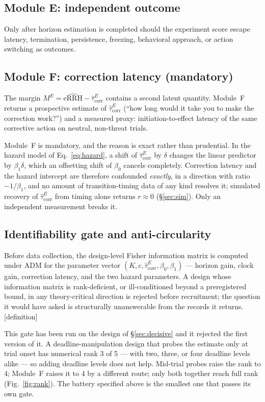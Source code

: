 \documentclass[9pt,twocolumn]{article}
\newcommand{\eRRHhat}{\widehat{\mathrm{eRRH}}}
\newcommand{\tcorr}{\widehat{\tau}^{E}_{\mathrm{corr}}}
\newcommand{\tier}[1]{{\sffamily\scriptsize\color{RRHMSlate}[#1]}}
\begin{document}
\subsection{Module E: independent outcome}
Only after horizon estimation is completed should the experiment score escape latency, termination, persistence, freezing, behavioral approach, or action switching as outcomes.

\subsection{Module F: correction latency (mandatory)}
The margin $M^E=\eRRHhat-\tcorr$ contains a second latent quantity. Module~F returns a prospective estimate of $\tcorr$ (``how long would it take you to make the correction work?'') and a measured proxy: initiation-to-effect latency of the same corrective action on neutral, non-threat trials.

Module~F is mandatory, and the reason is exact rather than prudential. In the hazard model of Eq.~\ref{eq:hazard}, a shift of $\tcorr$ by $\delta$ changes the linear predictor by $\beta_1\delta$, which an offsetting shift of $\beta_{0}$ cancels completely. Correction latency and the hazard intercept are therefore confounded \emph{exactly}, in a direction with ratio $-1/\beta_1$, and no amount of transition-timing data of any kind resolves it; simulated recovery of $\tcorr$ from timing alone returns $r\approx0$ (\S\ref{sec:sim}). Only an independent measurement breaks it.

\subsection{Identifiability gate and anti-circularity}
Before data collection, the design-level Fisher information matrix is computed under ADM for the parameter vector $(K,c,\tcorr,\beta_0,\beta_1)$ --- horizon gain, clock gain, correction latency, and the two hazard parameters. A design whose information matrix is rank-deficient, or ill-conditioned beyond a preregistered bound, in any theory-critical direction is rejected before recruitment; the question it would have asked is structurally unanswerable from the records it returns. \tier{definition}

This gate has been run on the design of \S\ref{sec:decisive} and it rejected the first version of it. A deadline-manipulation design that probes the estimate only at trial onset has numerical rank 3 of 5 --- with two, three, or four deadline levels alike --- so adding deadline levels does not help. Mid-trial probes raise the rank to 4; Module~F raises it to 4 by a different route; only both together reach full rank (Fig.~\ref{fig:rank}). The battery specified above is the smallest one that passes its own gate.
\end{document}
